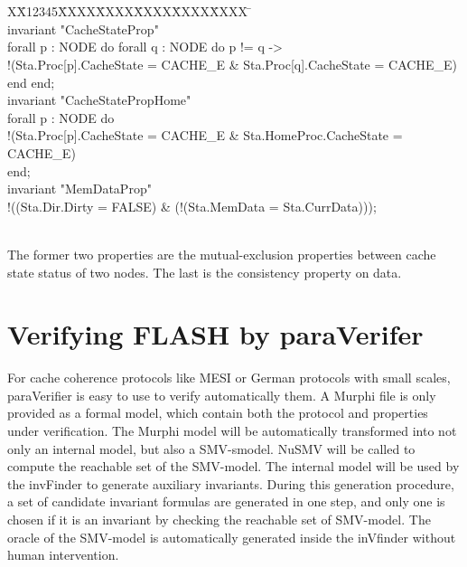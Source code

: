 \documentclass{llncs}
\newlength{\fminilength}
\newenvironment{fmini}[1][\linewidth]
  {\setlength{\fminilength}{#1\fboxsep-2\fboxrule}%
   \vspace{2ex}\noindent\begin{lrbox}{\fminibox}\begin{minipage}{\fminilength}%
   \mbox{ }\hfill\vspace{-2.5ex}}%
  {\end{minipage}\end{lrbox}\vspace{1ex}\hspace{0ex}%
   \framebox{\usebox{\fminibox}}}
\newenvironment{specification}
{\noindent\scriptsize
\tt\begin{fmini}\begin{tabbing}X\=X12345\=XXXX\=XXXX\=XXXX\=XXXX\=XXXX
\=\+\kill} {\end{tabbing}\normalfont\end{fmini}}
\begin{document}
\begin{specification}\\
invariant "CacheStateProp"\\
  forall p : NODE do forall q : NODE do     p != q ->\\
    !(Sta.Proc[p].CacheState = CACHE\_E \& Sta.Proc[q].CacheState = CACHE\_E)\\
  end end;\\

invariant "CacheStatePropHome"\\
  forall p : NODE do\\
    !(Sta.Proc[p].CacheState = CACHE\_E \& Sta.HomeProc.CacheState = CACHE\_E)\\
  end;\\

invariant "MemDataProp"\\
  !((Sta.Dir.Dirty = FALSE) \& (!(Sta.MemData = Sta.CurrData)));\\
\end{specification}\\

The former two properties are the mutual-exclusion properties between  cache state status of two nodes. The last is the  consistency property on data.

\section{Verifying FLASH by {\sf paraVerifer} \label{sec:experiments}}
For cache coherence protocols like MESI or German protocols with small scales,   {\sf paraVerifier}  is easy to use to verify automatically them. A Murphi file is only provided as a formal model, which contain both the protocol and properties under verification. The Murphi model will be automatically transformed into not only an internal model, but also a SMV-smodel. NuSMV will be called to compute the reachable set of the SMV-model. The internal model will be used by the {\sf invFinder} to generate auxiliary invariants. During this generation procedure, a set of candidate invariant formulas are generated in one step, and only one is chosen  if it is an invariant by checking the reachable set of   SMV-model. The oracle of the SMV-model is automatically generated inside the {\sf inVfinder} without human intervention.
\end{document}
